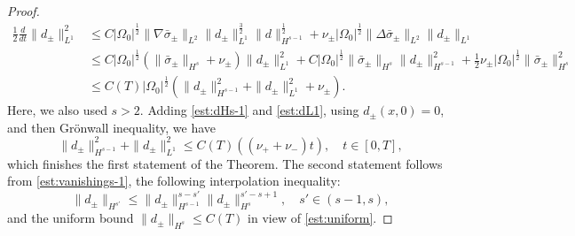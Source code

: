 \documentclass[11pt,reqno]{amsproc}
\newcommand{\na}{\nabla}
\begin{document}
\begin{proof}
    \begin{equation}\label{est:dL1}
    \begin{aligned}
        \frac12\frac{d}{dt}\|d_\pm\|_{L^1}^2 &\le C|\Omega_0|^\frac12\|\na \bar\sigma_\pm\|_{L^2} \|d_\pm\|_{L^1}^{\frac32}\|d\|_{H^{s-1}}^\frac12 + \nu_\pm |\Omega_0|^\frac12 \|\Delta\bar\sigma_\pm\|_{L^2}\|d_\pm\|_{L^1}\\
        &\le C|\Omega_0|^\frac12 (\|\bar\sigma_\pm\|_{H^s}+\nu_\pm) \|d_\pm\|_{L^1}^2 + C|\Omega_0|^\frac12 \|\bar\sigma_\pm\|_{H^s} \|d_\pm\|_{H^{s-1}}^2 + \frac12 \nu_\pm |\Omega_0|^\frac12 \|\bar\sigma_\pm\|_{H^s}^2\\
        &\le C(T)|\Omega_0|^\frac12(\|d_\pm\|_{H^{s-1}}^2 + \|d_\pm\|_{L^1}^2 + \nu_\pm).
    \end{aligned}
    \end{equation}
    Here, we also used $s > 2$. Adding \eqref{est:dHs-1} and \eqref{est:dL1}, using $d_\pm (x,0) = 0$, and then Gr\"onwall inequality, we have
    \begin{equation}\label{est:vanishings-1}
    \|d_\pm\|_{H^{s-1}}^2 + \|d_\pm\|_{L^1}^2 \le C(T) ((\nu_+ + \nu_-) t),\quad t \in [0,T],
    \end{equation}
    which finishes the first statement of the Theorem. The second statement follows from \eqref{est:vanishings-1}, the following interpolation inequality:
    $$
    \|d_\pm\|_{H^{s'}} \le \|d_\pm\|_{H^{s-1}}^{s-s'} \|d_\pm\|_{H^{s}}^{s'-s+1},\quad s' \in (s-1,s),
    $$
    and the uniform bound $\|d_\pm\|_{H^s} \le C(T)$ in view of \eqref{est:uniform}.
\end{proof}
 
\end{document}
